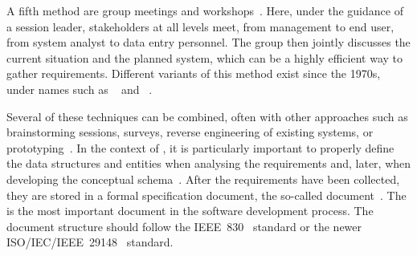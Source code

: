 A fifth method are group meetings and workshops~\cite{Z2003RDARS}.
Here, under the guidance of a session leader, stakeholders at all levels meet, from management to end user, from system analyst to data entry personnel.
The group then jointly discusses the current situation and the planned system, which can be a highly efficient way to gather requirements.
Different variants of this method exist since the 1970s, under names such as ~\cite{CWG1993PAJADATC,M1996RTWSS} and ~\cite{CWG1993PAJADATC,FMRSW1989OOSAATSDASD}.

Several of these techniques can be combined, often with other approaches such as brainstorming sessions, surveys, reverse engineering of existing systems, or prototyping~\cite{I2018SAH,Z2003RDARS}.
In the context of \dbs, it is particularly important to properly define the data structures and entities when analysing the requirements and, later, when developing the conceptual schema~\cite{M1987DFADSMFDRACS}.%
%
\endhsection%
%
%
After the requirements have been collected, they are stored in a formal specification document, the so-called  document~\cite{S2010DSRSAR,W2004ASOTMFMTQOTRSD}.
The  is the most important document in the software development process.
The document structure should follow the IEEE~830~\cite{IEEE1998IRPFSRS} standard or the newer ISO/IEC/IEEE~29148~\cite{ISOIECIEEE2018SASELCPRE} standard.%
\endhsection%
%
\endhsection%
%
